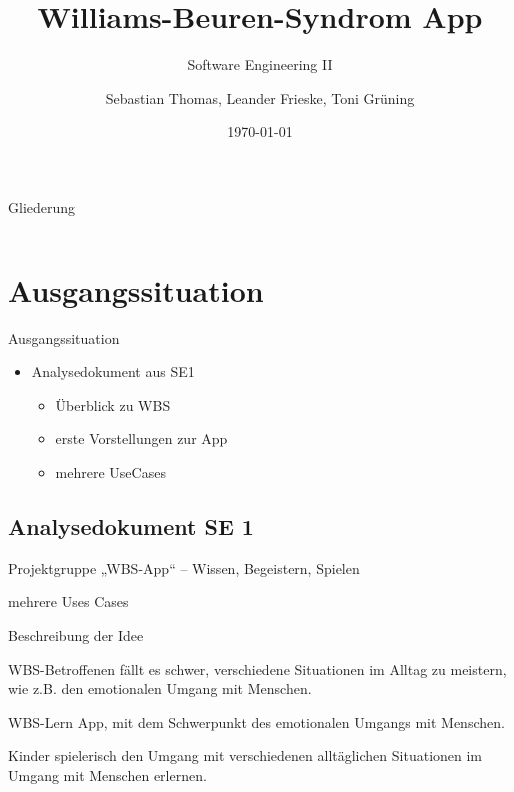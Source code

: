 \documentclass[10pt,fleqn]{beamer}
\title[WBS]{Williams-Beuren-Syndrom App}
\subtitle[]{Software Engineering II}
\date{\today}
\author{Sebastian Thomas, Leander Frieske, Toni Grüning}
\begin{document}

\begin{frame}
	\titlepage
\end{frame}

\begin{frame}{Gliederung}
 	\begin{columns}
   		\begin{column}{10.0cm}
		    \renewcommand{\baselinestretch}{1.5}
		    \normalsize
		    \tableofcontents
		    \renewcommand{\baselinestretch}{1.0}
		    \normalsize
	   	\end{column}
	   	\hspace*{-1.3cm}
	\end{columns}
\end{frame}


\section{Ausgangssituation}
	\begin{frame}[t]{Ausgangssituation}
		\begin{itemize}
			\item Analysedokument aus SE1
			\begin{itemize}
				\item Überblick zu WBS
				\item erste Vorstellungen zur App
				\item mehrere UseCases
			\end{itemize}
		\end{itemize}
	\end{frame}

\subsection{Analysedokument SE 1}
\begin{frame}[t]{Projektgruppe}
„WBS-App“ – Wissen, Begeistern, Spielen

mehrere Uses Cases

Beschreibung der Idee

WBS-Betroffenen fällt es schwer, verschiedene Situationen im Alltag zu meistern,
wie z.B. den emotionalen Umgang mit Menschen.

WBS-Lern App, mit dem
Schwerpunkt des emotionalen Umgangs mit Menschen.

Kinder spielerisch den Umgang mit verschiedenen alltäglichen Situationen im Umgang
mit Menschen erlernen.
\end{frame} 
\end{document}

